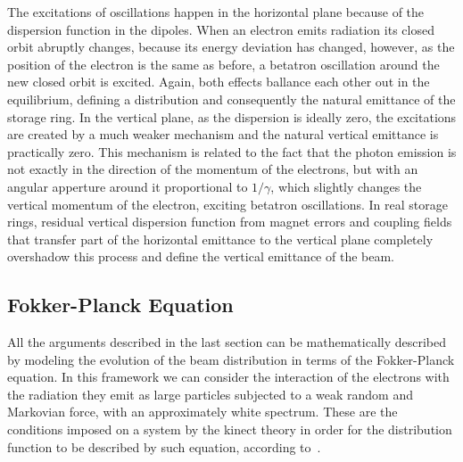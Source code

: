     The excitations of oscillations happen in the horizontal plane because of the dispersion function in the dipoles. When an electron emits radiation its closed orbit abruptly changes, because its energy deviation has changed, however, as the position of the electron is the same as before, a betatron oscillation around the new closed orbit is excited. Again, both effects ballance each other out in the equilibrium, defining a distribution and consequently the natural emittance of the storage ring. In the vertical plane, as the dispersion is ideally zero, the excitations are created by a much weaker mechanism and the natural vertical emittance is practically zero. This mechanism is related to the fact that the photon emission is not exactly in the direction of the momentum of the electrons, but with an angular apperture around it proportional to $1/\gamma$, which slightly changes the vertical momentum of the electron, exciting betatron oscillations. In real storage rings, residual vertical dispersion function from magnet errors and coupling fields that transfer part of the horizontal emittance to the vertical plane completely overshadow this process and define the vertical emittance of the beam.

\subsection{Fokker-Planck Equation}\label{ssec:fokker_planck_equation}

	All the arguments described in the last section can be mathematically described by modeling the evolution of the beam distribution in terms of the Fokker-Planck equation. In this framework we can consider the interaction of the electrons with the radiation they emit as large particles subjected to a weak random and Markovian force, with an approximately white spectrum. These are the conditions imposed on a system by the kinect theory in order for the distribution function to be described by such equation, according to~.


